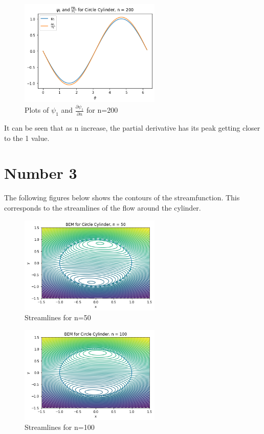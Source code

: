 \documentclass{article}
\begin{document}
		\begin{figure}[H]
			\centering
			\includegraphics[width=0.6\textwidth]{images/cl200.png}
			\caption{ Plots of $\psi_1$ and $\frac{\partial \psi_1}{\partial n}$ for n=200}
		\end{figure}
	
		It can be seen that as n increase, the partial derivative has its peak getting closer to the 1 value.
	
	\section*{Number 3}
		The following figures below shows the contours of the streamfunction. This corresponds to the streamlines of the flow around the cylinder. 
		
		\begin{figure}[H]
			\centering
			\includegraphics[width=0.6\textwidth]{images/c50v4.png}
			\caption{ Streamlines for n=50}
		\end{figure}
	
		\begin{figure}[H]
			\centering
			\includegraphics[width=0.6\textwidth]{images/c100v4.png}
			\caption{ Streamlines for n=100}
		\end{figure}
	
\end{document}
